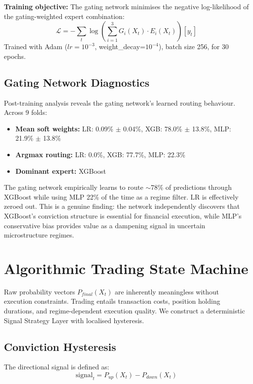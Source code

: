 \documentclass[conference]{IEEEtran}
\begin{document}
\textbf{Training objective:} The gating network minimises the negative
log-likelihood of the gating-weighted expert combination:
\begin{equation}
    \mathcal{L} = -\sum_{t} \log\left(\sum_{i=1}^{3} G_i(X_t) \cdot E_i(X_t)\right)[y_t]
\end{equation}
Trained with Adam ($lr=10^{-3}$, weight\_decay=$10^{-4}$), batch size 256,
for 30 epochs.

\subsection{Gating Network Diagnostics}
Post-training analysis reveals the gating network's learned routing
behaviour. Across 9 folds:
\begin{itemize}
    \item \textbf{Mean soft weights:} LR: 0.09\% $\pm$ 0.04\%, XGB: 78.0\% $\pm$ 13.8\%, MLP: 21.9\% $\pm$ 13.8\%
    \item \textbf{Argmax routing:} LR: 0.0\%, XGB: 77.7\%, MLP: 22.3\%
    \item \textbf{Dominant expert:} XGBoost
\end{itemize}

The gating network empirically learns to route $\sim$78\% of predictions
through XGBoost while using MLP 22\% of the time as a regime filter.
LR is effectively zeroed out. This is a genuine finding: the network
independently discovers that XGBoost's conviction structure is essential
for financial execution, while MLP's conservative bias provides value as
a dampening signal in uncertain microstructure regimes.

\section{Algorithmic Trading State Machine}

Raw probability vectors $P_{final}(X_t)$ are inherently meaningless without
execution constraints. Trading entails transaction costs, position holding
durations, and regime-dependent execution quality. We construct a
deterministic Signal Strategy Layer with localised hysteresis.

\subsection{Conviction Hysteresis}
The directional signal is defined as:
\begin{equation}
    \text{signal}_t = P_{up}(X_t) - P_{down}(X_t)
\end{equation}
\end{document}
